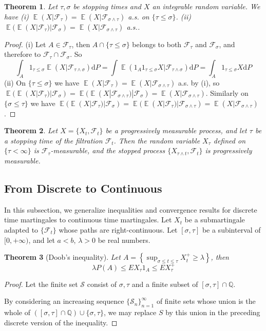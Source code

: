 \documentclass{article}
\newtheorem{Thm}{Theorem}[section]
\theoremstyle{definition}
\newcommand{\EE}{\operatorname{\mathbb{E}}}
\renewcommand{\leq}{\leqslant}
\renewcommand{\geq}{\geqslant}
\newcommand{\<}{\left\langle}
\renewcommand{\>}{\right\rangle}
\begin{document}
\begin{Thm}
    Let $\tau,\sigma$ be stopping times and $X$ an integrable random variable. We have \newline 
    (i) $\EE(X|\mathcal{F}_\tau)=\EE(X|\mathcal{F}_{\sigma\wedge \tau})$ a.s. on $\{\tau\leq \sigma\}$.\newline 
    (ii) $\EE(\EE(X|\mathcal{F}_\tau)|\mathcal{F}_\sigma)=\EE(X|\mathcal{F}_{\sigma\wedge \tau})$ a.s..
\end{Thm}
\begin{proof}
    (i) Let $A\in\mathcal{F}_\tau$, then $A\cap \{\tau\leq \sigma\}$ belongs to both $\mathcal{F}_\tau$ and $\mathcal{F}_\sigma$, and therefore to $\mathcal{F}_\tau\cap\mathcal{F}_\sigma$. So 
    \[ \int_A 1_{\tau\leq \sigma} \EE(X|\mathcal{F}_{\tau\wedge\sigma})\mathrm{d}P=\int \EE(1_A1_{\tau\leq \sigma}X|\mathcal{F}_{\tau\wedge\sigma})\mathrm{d}P=\int_A1_{\tau\leq \sigma}X\mathrm{d}P\]
    (ii) On $\{\tau\leq\sigma\}$ we have $\EE(X|\mathcal{F}_\tau)=\EE(X|\mathcal{F}_{\sigma\wedge \tau})$ a.s. by (i), so 
    $\EE(\EE(X|\mathcal{F}_\tau)|\mathcal{F}_\sigma)=\EE(\EE(X|\mathcal{F}_{\sigma\wedge \tau})|\mathcal{F}_\sigma)=\EE(X|\mathcal{F}_{\sigma\wedge \tau})$. Similarly on
    $\{\sigma\leq \tau\}$ we have $\EE(\EE(X|\mathcal{F}_\tau)|\mathcal{F}_\sigma)=\EE(\EE(X|\mathcal{F}_\tau)|\mathcal{F}_{\sigma\wedge \tau})=\EE(X|\mathcal{F}_{\sigma\wedge \tau})$.
\end{proof}
\begin{Thm}
    Let $X=\{X_t,\mathcal{F}_t\}$ be a progressively measurable process, and let $\tau$ be a stopping time of the filtration $\mathcal{F}_t$.
    Then the random variable $X_\tau$ defined on $\{\tau<\infty\}$ is $\mathcal{F}_\tau$-measurable, and the stopped process 
    $\{X_{\tau\wedge t},\mathcal{F}_t\}$ is progressively measurable.
\end{Thm}



\subsection{From Discrete to Continuous}
In this subsection, we generalize inequalities and convergence results for discrete time martingales to continuous time martingales.\newline 
Let $X_t$ be a submartingale adapted to $\{\mathcal{F}_t\}$ whose paths are right-continuous. Let $[\sigma,\tau]$ be a subinterval of $[0,+\infty)$,
and let $a<b$, $\lambda>0$ be real numbers.
\begin{Thm}[Doob's inequality]
    Let $A=\left\{ \sup_{\sigma\leq t\leq \tau}X_t^+  \geq\lambda\right\}$, then \[\lambda P(A)\leq EX_\tau1_A\leq EX_\tau^+\]
\end{Thm}
\begin{proof}
    Let the finite set $\mathcal{S}$ consist of $\sigma,\tau$ and a finite subset of $[\sigma,\tau]\cap \mathbb{Q}$.

    By considering an increasing sequence $\{\mathcal{S}_n\}_{n=1}^\infty$ of finite sets whose union is the whole of $([\sigma,\tau]\cap \mathbb{Q})\cup\{\sigma,\tau\}$,
    we may replace $S$ by this union in the preceding discrete version of the inequality.
\end{proof}
\end{document}
